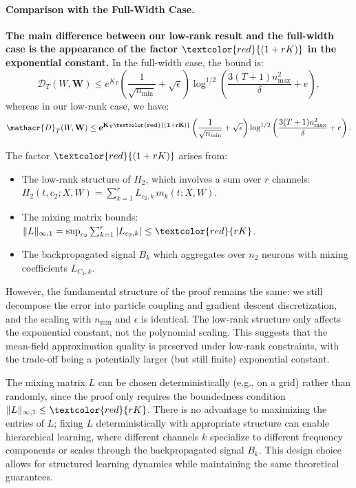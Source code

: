 \paragraph*{Comparison with the Full-Width Case.}
\textbf{The main difference between our low-rank result and the full-width case \cite{nguyen2020global} is the appearance of the factor $\textcolor{red}{(1+rK)}$ in the exponential constant.} In the full-width case, the bound is:
\[
\mathscr{D}_T(W, \mathbf{W}) \le e^{K_T}\left(\frac{1}{\sqrt{n_{\min}}} + \sqrt{\epsilon}\right)\log^{1/2}\left(\frac{3(T+1)n_{\max}^2}{\delta} + e\right),
\]
whereas in our low-rank case, we have:
\[
\mathscr{D}_T(W, \mathbf{W}) \le \mathbf{e^{K_T\textcolor{red}{(1+rK)}}}\left(\frac{1}{\sqrt{n_{\min}}} + \sqrt{\epsilon}\right)\log^{1/2}\left(\frac{3(T+1)n_{\max}^2}{\delta} + e\right).
\]

The factor $\textcolor{red}{(1+rK)}$ arises from:
\begin{itemize}
\item The low-rank structure of $H_2$, which involves a sum over $r$ channels: $H_2(t, c_2; X, W) = \sum_{k=1}^r L_{c_2,k}\,m_k(t; X, W)$.
\item The mixing matrix bounds: $\|L\|_{\infty,1} = \sup_{c_2}\sum_{k=1}^r |L_{c_2,k}| \le \textcolor{red}{rK}$.
\item The backpropagated signal $B_k$ which aggregates over $n_2$ neurons with mixing coefficients $L_{C_2,k}$.
\end{itemize}

However, the fundamental structure of the proof remains the same: we still decompose the error into particle coupling and gradient descent discretization, and the scaling with $n_{\min}$ and $\epsilon$ is identical. The low-rank structure only affects the exponential constant, not the polynomial scaling. This suggests that the mean-field approximation quality is preserved under low-rank constraints, with the trade-off being a potentially larger (but still finite) exponential constant.

\begin{remark}
The mixing matrix $L$ can be chosen deterministically (e.g., on a grid) rather than randomly, since the proof only requires the boundedness condition $\|L\|_{\infty,1} \le \textcolor{red}{rK}$. There is no advantage to maximizing the entries of $L$; fixing $L$ deterministically with appropriate structure can enable hierarchical learning, where different channels $k$ specialize to different frequency components or scales through the backpropagated signal $B_k$. This design choice allows for structured learning dynamics while maintaining the same theoretical guarantees.
\end{remark}

